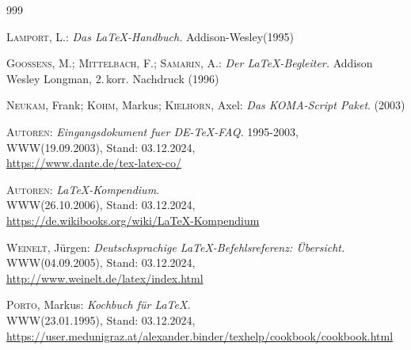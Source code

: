 %

\begin{thebibliography}{999}

 \textsc{Lamport}, L.: \textit{Das \LaTeX-Handbuch.} Addison-Wesley(1995)  

 \textsc{Goossens}, M.; \textsc{Mittelbach}, F.; \textsc{Samarin}, A.:
			\textit{Der \LaTeX-Begleiter.} Addison Wesley Longman, 2.\,korr. Nachdruck (1996)

   	\textsc{Neukam}, Frank; \textsc{Kohm}, Markus; \textsc{Kielhorn}, Axel:
			\textit{Das KOMA-Script Paket}. (2003)	
			 		
 \textsc{Autoren}: \textit{Eingangsdokument fuer DE-TeX-FAQ.} 1995-2003,\\ 
			{\small WWW(19.09.2003), Stand: 03.12.2024,}\\ 
			\url{https://www.dante.de/tex-latex-co/}

 \textsc{Autoren}: \textit{\LaTeX-Kompendium.}\\
			{\small WWW(26.10.2006), Stand: 03.12.2024,}\\
			\url{https://de.wikibooks.org/wiki/LaTeX-Kompendium}

 \textsc{Weinelt}, Jürgen: \textit{Deutschsprachige LaTeX-Befehlsreferenz: Übersicht.}\\
			{\small WWW(04.09.2005), Stand: 03.12.2024,} \\
			\url{http://www.weinelt.de/latex/index.html}

 \textsc{Porto}, Markus: \textit{Kochbuch für \LaTeX.}\\ 
			{\small WWW(23.01.1995), Stand: 03.12.2024,}\\ 			
			\url{https://user.medunigraz.at/alexander.binder/texhelp/cookbook/cookbook.html}
	
\end{thebibliography}
